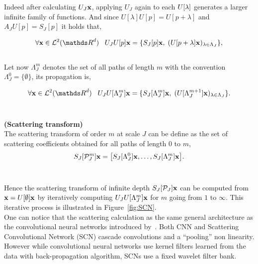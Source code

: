 \documentclass[a4paper,11pt]{report}
\begin{document}
			Indeed after calculating $U_{J}{\bf x}$, applying $U_{J}$ again to each $U[\lambda]\bf$ generates a larger infinite family of functions. And since $U[\lambda]U[p] = U[p+\lambda]$ and $ A_{J}U[p] = S_{J}[p]$ it holds that,
			
			\begin{equation}
					\forall \bfx \in \mcalL^{2}(\dsR^{d}) \;\;\; U_{J}U[p] \bfx = \{ S_{J}[p]\bfx , \; (U[p+\lambda]\bfx)_{\lambda \in \Lambda_{J}} \},
					\label{eq:SCN propagation 1}
			\end{equation}\\
			
			Let now $\Lambda_{J}^{m}$ denotes the set of all paths of length $m$ with the convention $\Lambda_{J}^{0} = \{ \emptyset \}$, its propagation is,
			
			\begin{equation}
					\forall \bfx \in \mcalL^{2}(\dsR^{d}) \;\;\; U_{J}U[\Lambda_{J}^{m}] \bfx = \{ S_{J}[\Lambda_{J}^{m}]\bfx , \; (U[\Lambda_{J}^{m+1}]\bfx)_{\lambda \in \Lambda_{J}} \}.
					\label{eq:SCN propagation 2}
			\end{equation}\\
			
			\begin{defn}  \textbf{(Scattering transform)}\\			  
			  The scattering transform of order $m$ at scale $J$ can be define as the set of scattering coefficients obtained for all paths of length $0$ to $m$,
			  \begin{equation}
			    S_{J}[\mathcal{P}_{J}^{m}]{\bf x} = \big[S_{J}[\Lambda_{J}^{0}]{\bf x} , \dots , S_{J}[\Lambda_{J}^{m}]{\bf x} \big].\\
					\label{eq:scattering transform}
			  \end{equation}\\ 
			\end{defn}
			
			Hence the scattering transform of infinite depth $S_{J}[\mathcal{P}_{J}]{\bf x}$ can be computed from ${\bf x}= U[\emptyset]{\bf x}$ by iteratively computing $U_{J}U[\Lambda_{J}^{m}] {\bf x}$ for $m$ going from $1$ to $\infty$. This iterative process is illustrated in Figure~\ref{fig:SCN}.\\
			
			One can notice that the scattering calculation as the same general architecture as the convolutional neural networks introduced by~\citep{lecun1995convolutional}. Both CNN and Scattering Convolutional Network (SCN) cascade convolutions and a ``pooling'' non linearity. However while convolutional neural networks use kernel filters learned from the data with back-propagation algorithm, SCNs use a fixed wavelet filter bank. 
\end{document}
